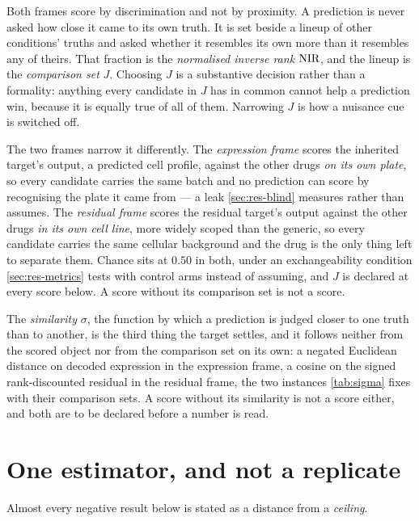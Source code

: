 Both frames score by discrimination and not by proximity. A prediction is never
asked how close it came to its own truth. It is set beside a lineup of other
conditions' truths and asked whether it resembles its own more than it resembles
any of theirs. That fraction is the \emph{normalised inverse rank}
$\textrm{NIR}$, and the lineup is the \emph{comparison set} $J$.
Choosing $J$ is a substantive decision rather than a formality: anything every
candidate in $J$ has in common cannot help a prediction win, because it is
equally true of all of them. Narrowing $J$ is how a nuisance cue is switched off.

The two frames narrow it differently. The \Eframe{} \emph{expression frame}
scores the inherited target's output, a predicted cell profile, against the other
drugs \emph{on its own plate}, so every candidate carries the same batch and no
prediction can score by recognising the plate it came from --- a leak
\cref{sec:res-blind} measures rather than assumes. The \Rframe{} \emph{residual
frame} scores the residual target's output against the other drugs \emph{in its
own cell line}, more widely scoped than the generic, so every candidate carries
the same cellular background and the drug is the only thing left to separate
them. Chance sits at $0.50$ in both, under an exchangeability condition
\cref{sec:res-metrics} tests with control arms instead of assuming, and $J$ is
declared at every score below. A score without its comparison set is not a score.

The \emph{similarity} $\sigma$, the function by which a prediction is judged
closer to one truth than to another, is the third thing the target settles, and
it follows neither from the scored object nor from the comparison set on its own:
a negated Euclidean distance on decoded expression in the expression frame, a
cosine on the signed rank-discounted residual in the residual frame, the two
instances \cref{tab:sigma} fixes with their comparison sets. A score without its
similarity is not a score either, and both are to be declared before a number is
read.



\section{One estimator, and not a replicate}

Almost every negative result below is stated as a distance from a
\emph{ceiling}. 

